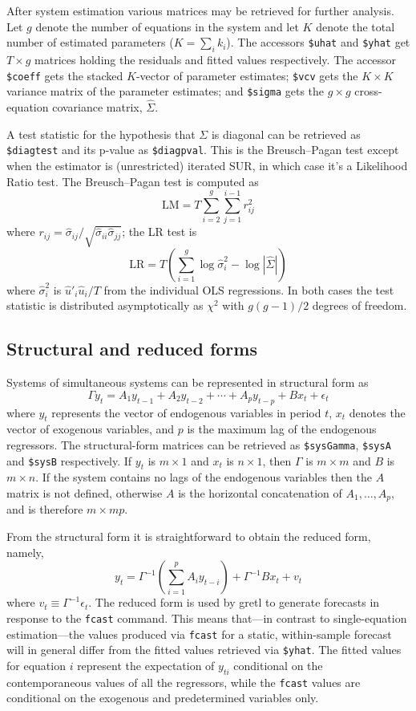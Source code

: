 After system estimation various matrices may be retrieved for further
analysis.  Let $g$ denote the number of equations in the system and
let $K$ denote the total number of estimated parameters ($K = \sum_i
k_i$). The accessors \verb|$uhat| and \verb|$yhat| get $T \times g$
matrices holding the residuals and fitted values respectively. The
accessor \verb|$coeff| gets the stacked $K$-vector of parameter
estimates; \verb|$vcv| gets the $K \times K$ variance matrix of the
parameter estimates; and \verb|$sigma| gets the $g \times g$
cross-equation covariance matrix, $\hat{\Sigma}$.

A test statistic for the hypothesis that $\Sigma$ is diagonal can be
retrieved as \verb|$diagtest| and its p-value as
\verb|$diagpval|. This is the Breusch--Pagan test except when the
estimator is (unrestricted) iterated SUR, in which case it's a
Likelihood Ratio test. The Breusch--Pagan test is computed as
\[
\mbox{LM} = T \sum_{i=2}^g \sum_{j=1}^{i-1} r^2_{ij}
\]
where $r_{ij} = \hat{\sigma}_{ij} /
\sqrt{\hat{\sigma}_{ii}\hat{\sigma}_{jj}}$; the LR test is
\[
\mbox{LR} = T \left(\sum_{i=1}^g \log \hat{\sigma}^2_i -\log 
 |\hat{\Sigma}| \right)
\]
where $\hat{\sigma}^2_i$ is $\hat{u}'_i \hat{u}_i / T$ from the
individual OLS regressions. In both cases the test statistic is
distributed asymptotically as $\chi^2$ with $g(g-1)/2$ degrees of
freedom. 

\subsection{Structural and reduced forms}

Systems of simultaneous systems can be represented in structural form
as
\[
\Gamma y_t = A_1 y_{t-1} + A_2 y_{t-2} + \cdots + A_p y_{t-p}
 + B x_t + \epsilon_t
\]
where $y_t$ represents the vector of endogenous variables in period
$t$, $x_t$ denotes the vector of exogenous variables, and $p$ is the
maximum lag of the endogenous regressors.  The structural-form
matrices can be retrieved as \verb|$sysGamma|, \verb|$sysA| and
\verb|$sysB| respectively. If $y_t$ is $m \times 1$ and $x_t$ is $n
\times 1$, then $\Gamma$ is $m \times m$ and $B$ is $m \times n$. If
the system contains no lags of the endogenous variables then the $A$
matrix is not defined, otherwise $A$ is the horizontal concatenation
of $A_1,\dots,A_p$, and is therefore $m \times mp$.

From the structural form it is straightforward to obtain the reduced
form, namely,
\[
y_t = \Gamma^{-1} \left(\sum_{i=1}^p A_i y_{t-i}\right)
 + \Gamma^{-1} B x_t + v_t
\]
where $v_t \equiv \Gamma^{-1}\epsilon_t$. The reduced form is used by
gretl to generate forecasts in response to the \texttt{fcast}
command. This means that---in contrast to single-equation
estimation---the values produced via \texttt{fcast} for a static,
within-sample forecast will in general differ from the fitted values
retrieved via \verb|$yhat|. The fitted values for equation $i$
represent the expectation of $y_{ti}$ conditional on the
contemporaneous values of all the regressors, while the \texttt{fcast}
values are conditional on the exogenous and predetermined variables
only.


